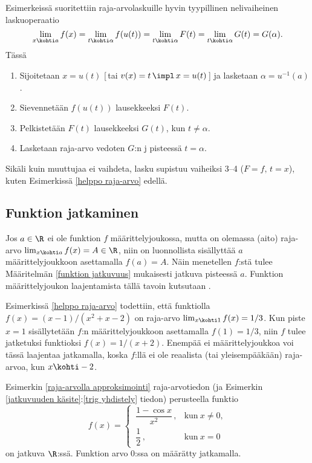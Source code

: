 Esimerkeissä suoritettiin raja-arvolaskuille hyvin tyypillinen nelivaiheinen lasku\-operaatio
\[
\lim_{x \kohti a} f(x) = \lim_{t\kohti\alpha} f(u(t)) = \lim_{t\kohti\alpha} F(t)
                       = \lim_{t\kohti\alpha} G(t) = G(\alpha).
\]
Tässä
\begin{enumerate}
\item Sijoitetaan $x=u(t)$ [\,tai $v(x)=t\,\impl\,x=u(t)$\,] ja lasketaan $\alpha=u^{-1}(a)$.
\item Sievennetään $f(u(t))$ lausekkeeksi $F(t)$.
\item Pelkistetään $F(t)$ lausekkeeksi $G(t)$, kun $t\neq\alpha$.
\item Lasketaan raja-arvo vedoten $G$:n j pisteessä $t=\alpha$.
\end{enumerate}
Sikäli kuin muuttujaa ei vaihdeta, lasku supistuu vaiheiksi 3--4 ($F=f,\,t=x$), kuten
Esimerkissä \ref{helppo raja-arvo} edellä.

\subsection*{Funktion jatkaminen}

Jos $a\in\R$ ei ole funktion $f$ määrittelyjoukossa, mutta on olemassa (aito) raja-arvo
$\lim_{x\kohti a} f(x)=A\in\R$, niin on luonnollista sisällyttää $a$ määrittelyjoukkoon
asettamalla $f(a)=A$. Näin menetellen $f$:stä tulee Määritelmän \ref{funktion jatkuvuus}
mukaisesti jatkuva pisteessä $a$. Funktion määrittelyjoukon laajentamista tällä tavoin
kutsutaan .
\begin{Exa} Esimerkissä \ref{helppo raja-arvo} todettiin, että funktiolla
$f(x)=(x-1)/(x^2+x-2)$ on raja-arvo $\lim_{x \kohti 1}f(x)=1/3$. Kun piste $x=1$ sisällytetään
$f$:n määrittelyjoukkoon asettamalla $f(1)=1/3$, niin $f$ tulee jatketuksi funktioksi
$f(x)=1/(x+2)$. Enempää ei määrittelyjoukkoa voi tässä laajentaa jatkamalla, koska
$f$:llä ei ole reaalista (tai yleisempääkään) raja-arvoa, kun $x \kohti -2$. \loppu
\end{Exa}
\begin{Exa} Esimerkin \ref{raja-arvolla approksimointi} raja-arvotiedon
(ja Esimerkin \ref{jatkuvuuden käsite}:\ref{trig yhdistely} tiedon) perusteella funktio
\[ 
f(x) = \begin{cases} \,\dfrac{1-\cos x}{x^2}\,, &\text{kun}\ x \neq 0, \\[2mm]
                     \,\dfrac{1}{2}\,,          &\text{kun}\ x=0
       \end{cases}
\]
on jatkuva $\R$:ssä. Funktion arvo $0$:ssa on määrätty jatkamalla. \loppu
\end{Exa}             

